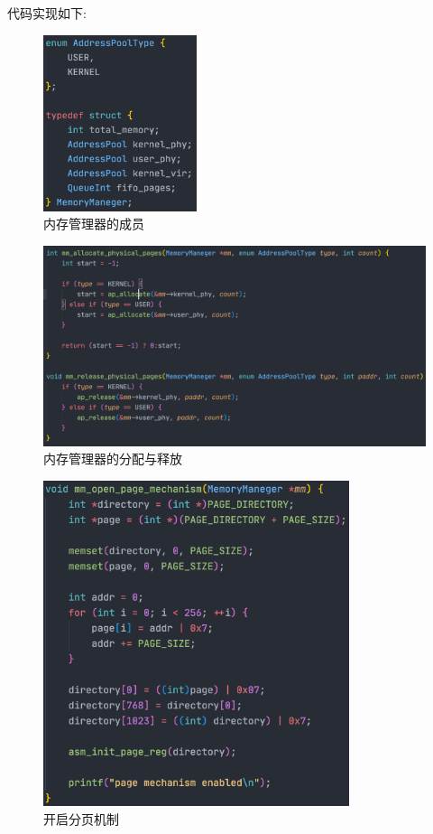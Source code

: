 代码实现如下:

\begin{figure}[H]
    \centering
    \includegraphics[width=0.4\textwidth]{figures/mm0.png}
    \caption{内存管理器的成员}
    \label{fig:my_label}
\end{figure}

\begin{figure}[H]
    \centering
    \includegraphics[width=\textwidth]{figures/mm1.png}
    \caption{内存管理器的分配与释放}
    \label{fig:my_label}
\end{figure}

\begin{figure}[H]
    \centering
    \includegraphics[width=0.8\textwidth]{figures/mm2.png}
    \caption{开启分页机制}
    \label{fig:my_label}
\end{figure}

